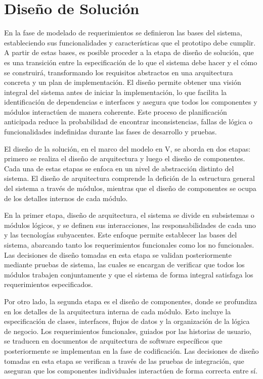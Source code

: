 \chapter[Diseño de Solución]{Diseño de Solución}
\label{cp:design}

\parindent0pt

En la fase de modelado de requerimientos se definieron las bases del sistema, estableciendo sus funcionalidades y características que el prototipo debe cumplir. A partir de estas bases, es posible proceder a la etapa de diseño de solución, que es una transición entre la especificación de lo que el sistema debe hacer y el cómo se construirá, transformando los requisitos abstractos en una arquitectura concreta y un plan de implementación. El diseño permite obtener una visión integral del sistema antes de iniciar la implementación, lo que facilita la identificación de dependencias e interfaces y asegura que todos los componentes y módulos interactúen de manera coherente. Este proceso de planificación anticipada reduce la probabilidad de encontrar inconsistencias, fallas de lógica o funcionalidades indefinidas durante las fases de desarrollo y pruebas.

El diseño de la solución, en el marco del modelo en V, se aborda en dos etapas: primero se realiza el diseño de arquitectura y luego el diseño de componentes. Cada una de estas etapas se enfoca en un nivel de abstracción distinto del sistema. El diseño de arquitectura comprende la defición de la estructura general del sistema a través de módulos, mientras que el diseño de componentes se ocupa de los detalles internos de cada módulo.

En la primer etapa, diseño de arquitectura, el sistema se divide en subsistemas o módulos lógicos, y se definen sus interacciones, las responsabilidades de cada uno y las tecnologías subyacentes. Este enfoque permite establecer las bases del sistema, abarcando tanto los requerimientos funcionales como los no funcionales. Las decisiones de diseño tomadas en esta etapa se validan posteriormente mediante pruebas de sistema, las cuales se encargan de verificar que todos los módulos trabajen conjuntamente y que el sistema de forma integral satisfaga los requerimientos especificados.

Por otro lado, la segunda etapa es el diseño de componentes, donde se profundiza en los detalles de la arquitectura interna de cada módulo. Esto incluye la especificación de clases, interfaces, flujos de datos y la organización de la lógica de negocio. Los requerimientos funcionales, guiados por las historias de usuario, se traducen en documentos de arquitectura de software específicos que posteriormente se implementan en la fase de codificación. Las decisiones de diseño tomadas en esta etapa se verifican a través de las pruebas de integración, que aseguran que los componentes individuales interactúen de forma correcta entre sí.

